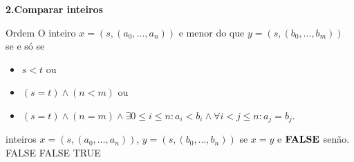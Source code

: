 \documentclass{beamer}
\begin{document}
\begin{frame}[fragile]{\bf 2.}{\bf Comparar inteiros}

\begin{block}{Ordem}
 O inteiro $x=(s,(a_0,\ldots, a_n))$ e menor do que $y=(s,(b_0,\ldots, b_m))$ se e só se
\begin{itemize}
 \item[] $s<t$ ou
 \item[] $(s=t) \wedge (n<m)$  ou 
 \item[] $(s=t) \wedge (n=m) \wedge \exists 0\leq i \leq n: a_i<b_i \wedge \forall i<j\leq n: a_j=b_j$.
\end{itemize}

\end{block}

\end{frame}

\begin{frame}

\begin{algorithmic}
\REQUIRE inteiros $x=(s,(a_0,\ldots, a_n))$, $y=(s,(b_0,\ldots, b_n))$
 se $x=y$ e ${\bf FALSE}$ senão.
      \RETURN FALSE
    \ENDIF
  \ENDFOR
\ELSE
  \RETURN FALSE
\ENDIF
\RETURN TRUE
\end{algorithmic}

\end{frame}
\end{document}
